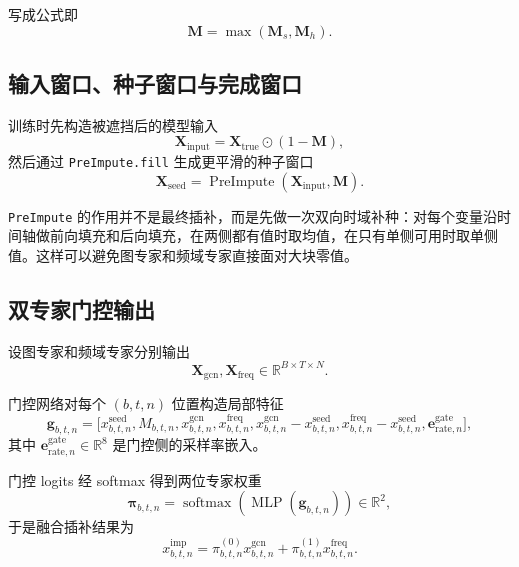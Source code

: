 \documentclass[UTF8]{ctexart}
\begin{document}
写成公式即
\begin{equation}
    \bm{M} = \max(\bm{M}_s,\bm{M}_h).
\end{equation}

\subsection{输入窗口、种子窗口与完成窗口}

训练时先构造被遮挡后的模型输入
\begin{equation}
    \bm{X}_{\text{input}} = \bm{X}_{\text{true}} \odot (1-\bm{M}),
\end{equation}
然后通过 \texttt{PreImpute.fill} 生成更平滑的种子窗口
\begin{equation}
    \bm{X}_{\text{seed}} = \operatorname{PreImpute}(\bm{X}_{\text{input}}, \bm{M}).
\end{equation}

\texttt{PreImpute} 的作用并不是最终插补，而是先做一次双向时域补种：对每个变量沿时间轴做前向填充和后向填充，在两侧都有值时取均值，在只有单侧可用时取单侧值。这样可以避免图专家和频域专家直接面对大块零值。

\subsection{双专家门控输出}

设图专家和频域专家分别输出
\begin{equation}
    \bm{X}_{\text{gcn}}, \bm{X}_{\text{freq}} \in \mathbb{R}^{B \times T \times N}.
\end{equation}

门控网络对每个 \((b,t,n)\) 位置构造局部特征
\begin{equation}
    \bm{g}_{b,t,n} =
    \Big[
        x^{\text{seed}}_{b,t,n},
        M_{b,t,n},
        x^{\text{gcn}}_{b,t,n},
        x^{\text{freq}}_{b,t,n},
        x^{\text{gcn}}_{b,t,n} - x^{\text{seed}}_{b,t,n},
        x^{\text{freq}}_{b,t,n} - x^{\text{seed}}_{b,t,n},
        \bm{e}^{\text{gate}}_{\text{rate},n}
    \Big],
\end{equation}
其中 \(\bm{e}^{\text{gate}}_{\text{rate},n}\in\mathbb{R}^{8}\) 是门控侧的采样率嵌入。

门控 logits 经 softmax 得到两位专家权重
\begin{equation}
    \bm{\pi}_{b,t,n} = \operatorname{softmax}(\operatorname{MLP}(\bm{g}_{b,t,n})) \in \mathbb{R}^{2},
\end{equation}
于是融合插补结果为
\begin{equation}
    x^{\text{imp}}_{b,t,n}
    =
    \pi^{(0)}_{b,t,n} x^{\text{gcn}}_{b,t,n}
    +
    \pi^{(1)}_{b,t,n} x^{\text{freq}}_{b,t,n}.
\end{equation}
\end{document}
